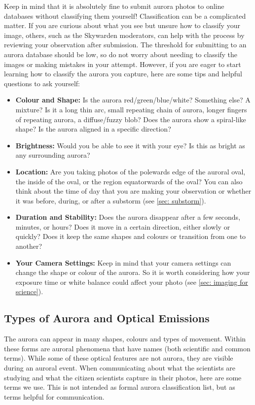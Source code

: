 \documentclass{article}
\newcommand{\contributed}[1]{%
    \par\noindent
    \begingroup
    \setlength{\leftskip}{1em}%
    \itshape
    Contributors: #1
    \par
    \endgroup
    \vspace{0.5em}
}
\begin{document}
Keep in mind that it is absolutely fine to submit aurora photos to online databases without classifying them yourself! Classification can be a complicated matter. If you are curious about what you see but unsure how to classify your image, others, such as the Skywarden moderators, can help with the process by reviewing your observation after submission. The threshold for submitting to an aurora database should be low, so do not worry about needing to classify the images or making mistakes in your attempt. However, if you are eager to start learning how to classify the aurora you capture, here are some tips and helpful questions to ask yourself:
\begin{itemize}
    \item \textbf{Colour and Shape:} Is the aurora red/green/blue/white? Something else? A mixture? Is it a long thin arc, small repeating chain of aurora, longer fingers of repeating aurora, a diffuse/fuzzy blob? Does the aurora show a spiral-like shape? Is the aurora aligned in a specific direction?
    \item \textbf{Brightness:} Would you be able to see it with your eye? Is this as bright as any surrounding aurora?
    \item \textbf{Location:} Are you taking photos of the polewards edge of the auroral oval, the inside of the oval, or the region equatorwards of the oval? You can also think about the time of day that you are making your observation or whether it was before, during, or after a substorm (see \ref{sec: substorm}).
    \item \textbf{Duration and Stability:} Does the aurora disappear after a few seconds, minutes, or hours? Does it move in a certain direction, either slowly or quickly? Does it keep the same shapes and colours or transition from one to another?
    \item \textbf{Your Camera Settings:} Keep in mind that your camera settings can change the shape or colour of the aurora. So it is worth considering how your exposure time or white balance could affect your photo (see \ref{sec: imaging for science}).
\end{itemize}


\subsection{Types of Aurora and Optical Emissions}
\label{sec: types of aurora}

The aurora can appear in many shapes, colours and types of movement.  Within these forms are auroral phenomena that have names (both scientific and common terms). While some of these optical features are not aurora, they are visible during an auroral event. When communicating about what the scientists are studying and what the citizen scientists capture in their photos, here are some terms we use. This is not intended as formal aurora classification list, but as terms helpful for communication.
\end{document}
